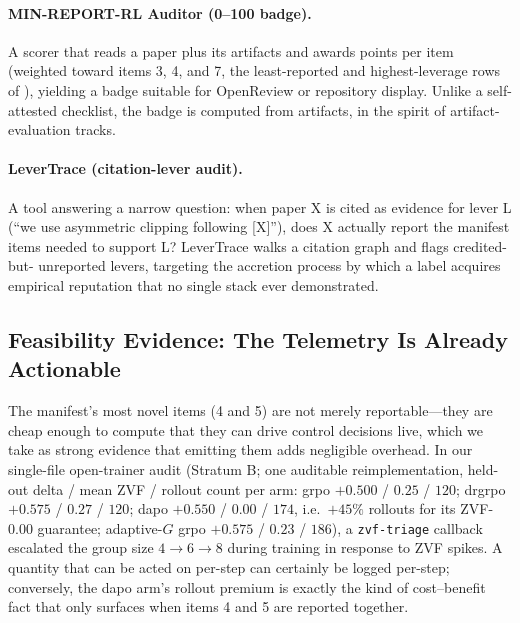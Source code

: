 \paragraph{MIN-REPORT-RL Auditor (0--100 badge).} A scorer that reads a paper
plus its artifacts and awards points per item (weighted toward items 3, 4,
and 7, the least-reported and highest-leverage rows of
), yielding a badge suitable for OpenReview or
repository display. Unlike a self-attested checklist, the badge is computed
from artifacts, in the spirit of artifact-evaluation tracks.

\paragraph{LeverTrace (citation-lever audit).} A tool answering a narrow
question: when paper X is cited as evidence for lever L (``we use asymmetric
clipping following [X]''), does X actually report the manifest items needed
to support L? LeverTrace walks a citation graph and flags credited-but-
unreported levers, targeting the accretion process by which a label acquires
empirical reputation that no single stack ever demonstrated.

\subsection{Feasibility Evidence: The Telemetry Is Already Actionable}
\label{sec:p5-feasibility}
The manifest's most novel items (4 and 5) are not merely reportable---they
are cheap enough to compute that they can drive control decisions live, which
we take as strong evidence that emitting them adds negligible overhead. In
our single-file open-trainer audit (Stratum B; one auditable
reimplementation, held-out delta / mean ZVF / rollout count per arm:
grpo $+0.500$ / $0.25$ / $120$; drgrpo $+0.575$ / $0.27$ / $120$; dapo
$+0.550$ / $0.00$ / $174$, i.e.\ $+45\%$ rollouts for its ZVF-$0.00$
guarantee; adaptive-$G$ grpo $+0.575$ / $0.23$ / $186$), a
\texttt{zvf-triage} callback escalated the group size $4 \to 6 \to 8$ during
training in response to ZVF spikes. A quantity that can be acted on per-step
can certainly be logged per-step; conversely, the dapo arm's rollout premium
is exactly the kind of cost--benefit fact that only surfaces when items 4 and
5 are reported together.

